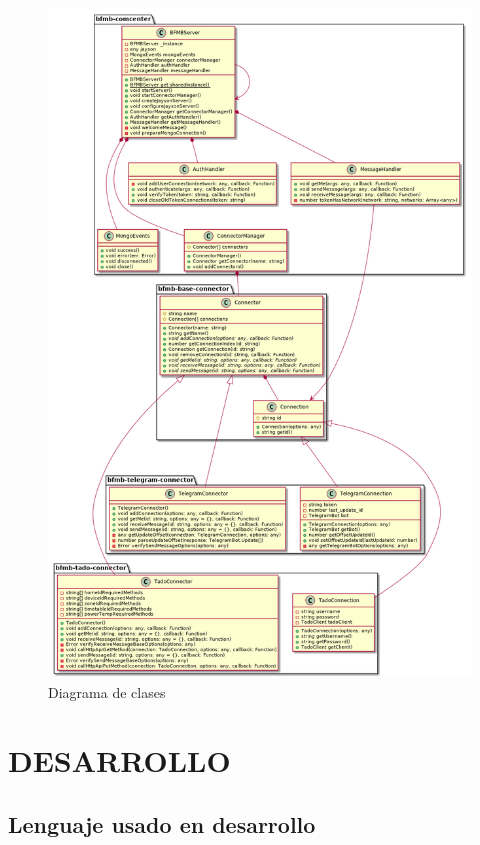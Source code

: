\documentclass[spanish,12pt, a4paper, twoside]{paper}
\let\oldsection\section
\def\section{\cleardoublepage\oldsection}
\begin{document}
\begin{figure}[h]
\centering
	\includegraphics[width=\textwidth]{recursos/classes}
\caption{Diagrama de clases}
\label{fig:Diagrama de clases}
\end{figure}

\section{DESARROLLO}

\subsection{Lenguaje usado en desarrollo}
\end{document}
